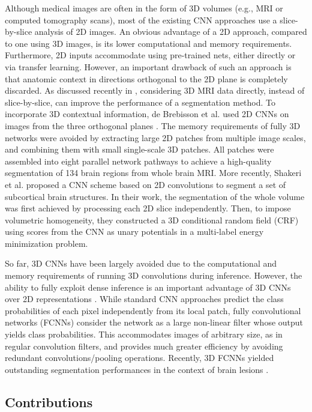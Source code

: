 \documentclass[twoside,fleqn,espcrc2]{elsarticle}
\begin{document}
Although medical images are often in the form of 3D volumes (e.g., MRI or computed tomography scans), most of the existing CNN approaches use a slice-by-slice analysis of 2D images. An obvious advantage of a 2D approach, compared to one using 3D images, is its lower computational and memory requirements. Furthermore, 2D inputs accommodate using pre-trained nets, either directly or via transfer learning. However, an important drawback of such an approach is that anatomic context in directions orthogonal to the 2D plane is completely discarded. As discussed recently in \cite{milletari2016hough}, considering 3D MRI data directly, instead of slice-by-slice, can improve the performance of a segmentation method. To incorporate 3D contextual information, de Brebisson et al. used 2D CNNs on images from the three orthogonal planes \cite{Brebisson2015deep}. The memory requirements of fully 3D networks were avoided by extracting large 2D patches from multiple image scales, and combining them with small single-scale 3D patches. All patches were assembled into eight parallel network pathways to achieve a high-quality segmentation of 134 brain regions from whole brain MRI. More recently, Shakeri et al. \cite{shakeri2016sub} proposed a CNN scheme based on 2D convolutions to segment a set of subcortical brain structures. In their work, the segmentation of the whole volume was first achieved by processing each 2D slice independently. Then, to impose volumetric homogeneity, they constructed a 3D conditional random field (CRF) using scores from the CNN as unary potentials in a multi-label energy minimization problem.

So far, 3D CNNs have been largely avoided due to the computational and memory requirements of running 3D convolutions during inference. However, the ability to fully exploit dense inference is an important advantage of 3D CNNs over 2D representations \cite{szegedy2015going}. While standard CNN approaches predict the class probabilities of each pixel independently from its local patch, fully convolutional networks (FCNNs) \cite{long2015fully} consider the network as a large non-linear filter whose output yields class probabilities. This accommodates images of arbitrary size, as in regular convolution filters, and provides much greater efficiency by avoiding redundant convolutions/pooling operations. Recently, 3D FCNNs yielded outstanding segmentation performances in the context of brain lesions \cite{brosch2015deep,kamnitsas2016efficient}.


\subsection{Contributions}
\end{document}
